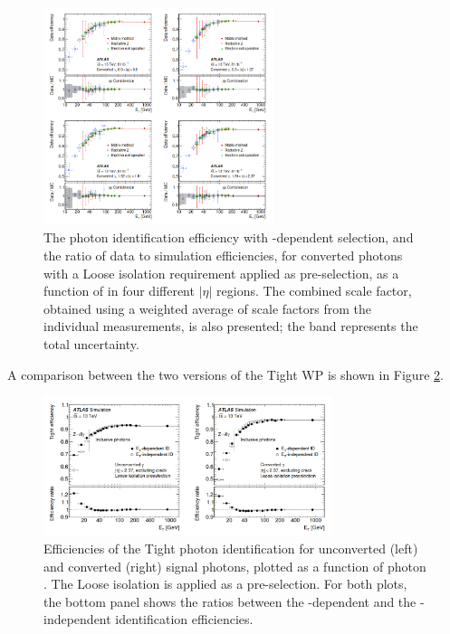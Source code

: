 \begin{figure}[htbp]
    \centering
    \includegraphics[width=0.6\textwidth]{Ch3/Img/Converted_Eff_2017.png}
    \caption{The photon identification efficiency with \eT-dependent selection, and the ratio of data to simulation efficiencies, for converted photons with a Loose isolation requirement applied as pre-selection, as a function of \eT in four different $|\eta|$ regions. The combined scale factor, obtained using a weighted average of scale factors from the individual measurements, is also presented; the band represents the total uncertainty.}
    \label{fig:gamma:ID:Eff:Cov}
\end{figure}
A comparison between the two versions of the Tight WP is shown in Figure \ref{fig:gamma:ID:Eff:Tight}.
\begin{figure}[htbp]
    \centering
    \includegraphics[width=0.75\textwidth]{Ch3/Img/Tight_ID.png}
    \caption{Efficiencies of the Tight photon identification for unconverted (left) and converted (right) signal photons, plotted as a function of photon \eT. The Loose isolation is applied as a pre-selection. For both plots, the bottom panel shows the ratios between the \eT-dependent and the \eT-independent identification efficiencies.}
    \label{fig:gamma:ID:Eff:Tight}
\end{figure}

